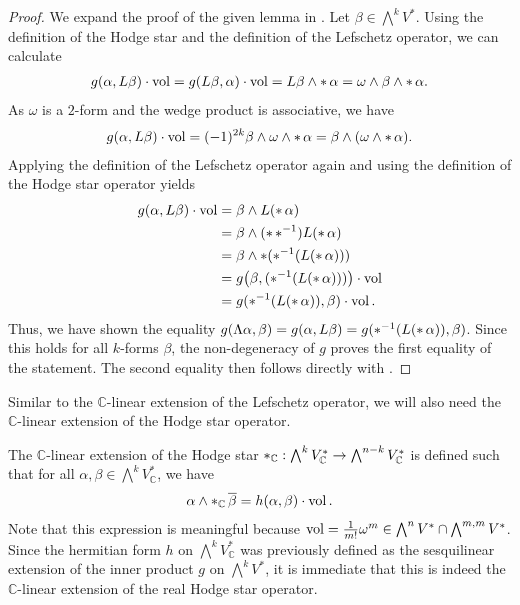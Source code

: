 \begin{proof} We expand the proof of the given lemma in \cite{Huybrechts2004}.
	Let $\beta \in \bigwedge^kV^*$. Using the definition of the Hodge star and the definition of the 
	Lefschetz operator, we can calculate
	\begin{align*}
		g(\alpha, L\beta)\cdot \operatorname{vol} = g(L\beta,\alpha) \cdot \operatorname{vol} = L\beta \wedge \operatorname{\ast} \alpha =
		\omega \wedge \beta \wedge \operatorname{\ast} \alpha.
	\end{align*}
	As $\omega$ is a $2$-form and the wedge product is associative, we have
	\begin{align*}
		g(\alpha, L\beta)\cdot \operatorname{vol}  = (-1)^{2k} \beta \wedge \omega \wedge \operatorname{\ast}\alpha = \beta
		\wedge (\omega \wedge \operatorname{\ast}\alpha).
	\end{align*}
	Applying the definition of the Lefschetz operator again and using the definition of the Hodge star
	operator yields 
	\begin{align*}
		g(\alpha, L\beta)\cdot \operatorname{vol}  &=\beta \wedge L (\operatorname{\ast} \alpha) \\
		&=  \beta \wedge (\operatorname{\ast} \operatorname{\ast}^{-1}) L (\operatorname{\ast} \alpha) \\
		&= \beta \wedge \operatorname{\ast} (\operatorname{\ast}^{-1} (L (\operatorname{\ast} \alpha))) \\
		&= g\big(\beta, (\operatorname{\ast}^{-1}( L (\operatorname{\ast} \alpha)))\big) \cdot \operatorname{vol} \\
		&=g(\operatorname{\ast}^{-1} (L (\operatorname{\ast} \alpha)), \beta)\cdot\operatorname{vol}.
	\end{align*}
	Thus, we have shown the equality 
	$g(\Lambda \alpha, \beta) = g(\alpha,L\beta) = g(\operatorname{\ast}^{-1}(L(\operatorname{\ast} \alpha)), \beta)$. 
	Since this holds for all $k$-forms $\beta$, the non-degeneracy of $g$ proves the first equality 
	of the statement. The second equality then follows directly with
	.  %
\end{proof}
Similar to the $\mathbb{C}$-linear extension of the Lefschetz operator, we will also need the
$\mathbb{C}$-linear extension of the Hodge star operator. 
\begin{defn}
	The $\mathbb{C}$-linear extension of the Hodge star 
	$\operatorname{\ast}_\mathbb{C} :\bigwedge^kV_\mathbb{C}^* \rightarrow \bigwedge^{n-k} V_\mathbb{C}^*$ 
	is defined such that for all $\alpha,\beta \in \bigwedge^kV^*_\mathbb{C}$, we have
	\begin{align*}
		\alpha \wedge \operatorname{\ast}_\mathbb{C}\overline{\beta} = h(\alpha, \beta) \cdot \operatorname{vol}.
	\end{align*}
	Note that this expression is meaningful because 
	$\operatorname{vol} = \frac{1}{m!} \omega^m \in \bigwedge^nV^*\cap \bigwedge^{m,m}V^*$.
	Since the hermitian form $h$ on $\bigwedge^kV_\mathbb{C}^*$ was previously defined as the
	sesquilinear extension of the inner product $g$ on $\bigwedge^kV^*$, it is immediate that this is indeed 
	the $\mathbb{C}$-linear extension of the real Hodge star operator.
\end{defn}
